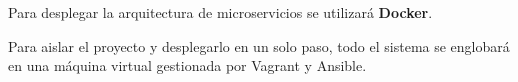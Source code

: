 \documentclass[../main.tex]{subfiles}
\begin{document}
Para desplegar la arquitectura de microservicios se utilizará \textbf{Docker}\cite{Anderson2015}.

Para aislar el proyecto y desplegarlo en un solo paso, todo el sistema se englobará en una máquina virtual gestionada por Vagrant\cite{Hashimoto2013} y Ansible\cite{Hochstein2014}.
\end{document}
